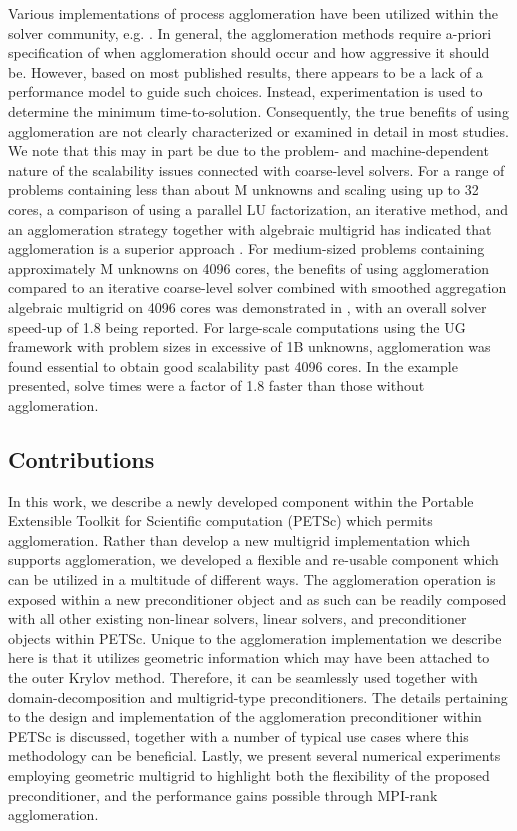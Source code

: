 \documentclass[]{siamart0216}
\begin{document}
Various implementations of process agglomeration have been utilized within the solver 
community, e.g. \cite{blatt2012massively, emans2011coarse, may2015scalable, muller2014massively, reiter2013massively, rudi2015extreme}. 
In general, the agglomeration methods require a-priori specification of when agglomeration should occur 
and how aggressive it should be. However, based on most published results, there appears to be a lack of a performance 
model to guide such choices. Instead, experimentation is used to determine the minimum time-to-solution.
Consequently, the true benefits of using agglomeration are not clearly characterized or examined in detail in most studies. 
We note that this may in part be due to the problem- and machine-dependent nature of the scalability issues 
connected with coarse-level solvers.
For a range of problems containing less than about M unknowns and scaling using up to 32 cores, a comparison of using a parallel LU factorization, an iterative method, and an agglomeration strategy together with algebraic multigrid has indicated that 
agglomeration is a superior approach \cite{emans2011coarse}. 
For medium-sized problems containing approximately M unknowns on 4096 cores, the benefits of using agglomeration compared to an iterative 
coarse-level solver combined with smoothed aggregation algebraic multigrid on 4096 cores was demonstrated in \cite{may2015scalable}, 
with an overall solver speed-up of 1.8 being reported. 
For large-scale computations using the UG framework \cite{reiter2013massively} with problem sizes in excessive of 1B unknowns,  agglomeration was found essential to obtain good scalability past 4096 cores. In the example presented, solve 
times were a factor of 1.8 faster than those without agglomeration.

\subsection{Contributions}
In this work, we describe a newly developed component within the Portable Extensible Toolkit for 
Scientific computation (PETSc) \cite{petsc-user-ref,petsc-web-page,petsc-efficient} which permits agglomeration. 
Rather than develop a new multigrid implementation which supports agglomeration, we 
developed a flexible and re-usable component which can be utilized in a multitude of different ways.
The agglomeration operation is exposed within a new preconditioner object and as such can be readily composed with 
all other existing non-linear solvers, linear solvers, and preconditioner objects within PETSc. 
Unique to the agglomeration implementation we describe here is that it utilizes geometric information which 
may have been attached to the outer Krylov method. Therefore, it can be seamlessly used together with domain-decomposition 
and multigrid-type preconditioners.
The details pertaining to the design and implementation of the agglomeration preconditioner within PETSc is discussed, 
together with a number of typical use cases where this methodology can be beneficial. 
Lastly, we present several numerical experiments employing geometric multigrid to highlight both the flexibility of the proposed 
preconditioner, and the performance gains possible through MPI-rank agglomeration.
\end{document}
